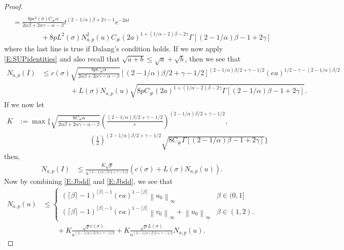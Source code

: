 \documentclass[a4paper,11pt]{article}
\numberwithin{equation}{section}
\theoremstyle{plain}
\theoremstyle{definition}
\newcommand{\Norm}[1]{\left\|  #1   \right\|}
\numberwithin{NQ}{section}
\numberwithin{LQ}{section}
\numberwithin{ZQ}{section}
\begin{document}
\begin{proof}
\begin{align*}
	\\& = \frac{8pc^2(\sigma)C_{\#} \alpha }{2\alpha\beta + 2\alpha \gamma - \alpha - \beta} t^{(2-1/\alpha)\beta + 2\gamma -1} e^{-2at} 
	\\&\quad\quad\quad\quad+ 8pL^2(\sigma)N^2_{a,p}(u) C_{\#} (2a)^{1+(1/\alpha - 2)\beta - 2\gamma}\Gamma\left[ (2-1/\alpha)\beta-1+2\gamma \right]
	\end{align*}
where the last line is true if Dalang's condition \cite{CHN19} holds. If we now apply \eqref{E:SUPidentities} and also recall that $\sqrt{a+b} \le \sqrt{a} + \sqrt{b}$, then we see that 
	\begin{align*}
	N_{a,p}(I) &\le  c(\sigma)\sqrt{\frac{8pC_{\#} \alpha }{2\alpha\beta + 2\alpha \gamma - \alpha - \beta}} \left[(2-1/\alpha)\beta/2+\gamma-1/2\right]^{(2-1/\alpha)\beta/2+\gamma-1/2}(ea)^{1/2 - \gamma - (2-1/\alpha)\beta/2} 
	\\&\quad\quad\quad\quad+ L(\sigma)N_{a,p}(u) \sqrt{8pC_{\#} (2a)^{1+(1/\alpha - 2)\beta - 2\gamma}\Gamma\left[ (2-1/\alpha)\beta-1+2\gamma \right]}.
	\end{align*}
If we now let 
	\begin{align*}
		K&:= \max\Bigg\{\sqrt{\frac{8C_{\#} \alpha }{2\alpha\beta + 2\alpha \gamma - \alpha - \beta}}\left(\frac{(2-1/\alpha)\beta/2+\gamma-1/2}{e}\right)^{(2-1/\alpha)\beta/2+\gamma-1/2},
		\\& \hspace{10em} \left(\frac{1}{2}\right)^{(2-1/\alpha)\beta/2+\gamma-1/2} \sqrt{8C_{\#}\Gamma\left[ (2-1/\alpha)\beta-1+2\gamma \right]}  \Bigg\}
	\end{align*}
then,
	\begin{align}
	\label{E:Ibdd}
			N_{a,p}(I) &\le\frac{K \sqrt{p}}{a^{(2-1/\alpha)\beta/2 + \gamma - 1/2}}\left( c(\sigma) + L(\sigma)N_{a,p}(u) \right).
	\end{align}
Now by combining \eqref{E:Jbdd} and \eqref{E:Jbdd}, we see that 
	\begin{align}
	N_{a,p}(u) & \le \begin{cases} 
	(\lceil \beta \rceil - 1)^{\lceil \beta \rceil -1}(ea)^{1-\lceil \beta \rceil} \Norm{u_0}_\infty  & \beta \in (0,1]
	\\ (\lceil \beta \rceil - 1)^{\lceil \beta \rceil -1}(ea)^{1-\lceil \beta \rceil} \Norm{v_0}_\infty + \Norm{u_0}_\infty & \beta \in (1,2). 
	\end{cases} 
	\\& \quad \quad  + K\frac{\sqrt{p}c(\sigma)}{a^{(2-1/\alpha)\beta/2+\gamma-1/2}}  + K  \frac{\sqrt{p}L(\sigma)}{a^{(2-1/\alpha)\beta/2+\gamma-1/2}} N_{a,p}(u). \label{E:Nbddgen}

\end{align}
\end{proof}
\end{document}
